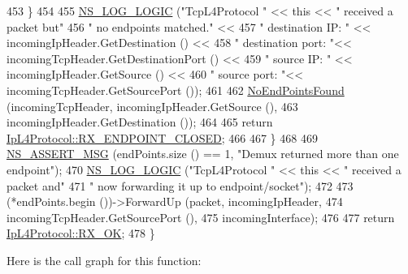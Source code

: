 \begin{DoxyCode}
453         \}
454 
455       \hyperlink{group__logging_ga88acd260151caf2db9c0fc84997f45ce}{NS\_LOG\_LOGIC} (\textcolor{stringliteral}{"TcpL4Protocol "} << \textcolor{keyword}{this} << \textcolor{stringliteral}{" received a packet but"}
456                     \textcolor{stringliteral}{" no endpoints matched."} <<
457                     \textcolor{stringliteral}{" destination IP: "} << incomingIpHeader.GetDestination () <<
458                     \textcolor{stringliteral}{" destination port: "}<< incomingTcpHeader.GetDestinationPort () <<
459                     \textcolor{stringliteral}{" source IP: "} << incomingIpHeader.GetSource () <<
460                     \textcolor{stringliteral}{" source port: "}<< incomingTcpHeader.GetSourcePort ());
461 
462       \hyperlink{classns3_1_1TcpL4Protocol_a16c65189190c60da860bc60681c01324}{NoEndPointsFound} (incomingTcpHeader, incomingIpHeader.GetSource (),
463                         incomingIpHeader.GetDestination ());
464 
465       \textcolor{keywordflow}{return} \hyperlink{classns3_1_1IpL4Protocol_afd3744c89902fff232e2fd45f558c80eac7f4577d3ab1a219d6cb2b6964c49afd}{IpL4Protocol::RX\_ENDPOINT\_CLOSED};
466 
467     \}
468 
469   \hyperlink{assert_8h_aff5ece9066c74e681e74999856f08539}{NS\_ASSERT\_MSG} (endPoints.size () == 1, \textcolor{stringliteral}{"Demux returned more than one endpoint"});
470   \hyperlink{group__logging_ga88acd260151caf2db9c0fc84997f45ce}{NS\_LOG\_LOGIC} (\textcolor{stringliteral}{"TcpL4Protocol "} << \textcolor{keyword}{this} << \textcolor{stringliteral}{" received a packet and"}
471                 \textcolor{stringliteral}{" now forwarding it up to endpoint/socket"});
472 
473   (*endPoints.begin ())->ForwardUp (packet, incomingIpHeader,
474                                     incomingTcpHeader.GetSourcePort (),
475                                     incomingInterface);
476 
477   \textcolor{keywordflow}{return} \hyperlink{classns3_1_1IpL4Protocol_afd3744c89902fff232e2fd45f558c80eabd979bce2f3b22521c81c4115c66317e}{IpL4Protocol::RX\_OK};
478 \}
\end{DoxyCode}


Here is the call graph for this function\+:


